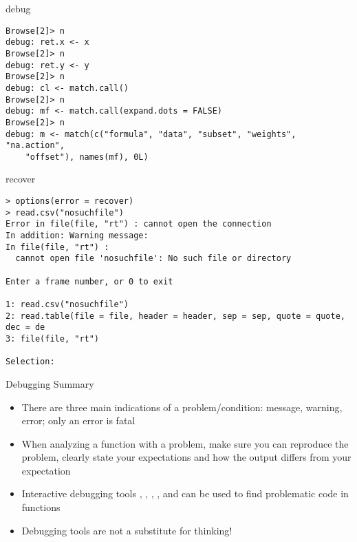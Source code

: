 \documentclass[aspectratio=169]{beamer}
\begin{document}
\begin{frame}[fragile]{debug}
\begin{verbatim}
Browse[2]> n
debug: ret.x <- x
Browse[2]> n
debug: ret.y <- y
Browse[2]> n
debug: cl <- match.call()
Browse[2]> n
debug: mf <- match.call(expand.dots = FALSE)
Browse[2]> n
debug: m <- match(c("formula", "data", "subset", "weights", "na.action", 
    "offset"), names(mf), 0L)
\end{verbatim}
\end{frame}

\begin{frame}[fragile]{recover}
\begin{verbatim}
> options(error = recover)
> read.csv("nosuchfile")
Error in file(file, "rt") : cannot open the connection
In addition: Warning message:
In file(file, "rt") :
  cannot open file 'nosuchfile': No such file or directory

Enter a frame number, or 0 to exit   

1: read.csv("nosuchfile")
2: read.table(file = file, header = header, sep = sep, quote = quote, dec = de
3: file(file, "rt")

Selection: 
\end{verbatim}
\end{frame}

\begin{frame}{Debugging}
Summary
\begin{itemize}
  \item There are three main indications of a problem/condition:
    message, warning, error; only an error is fatal
  \item When analyzing a function with a problem, make sure you can
    reproduce the problem, clearly state your expectations and how the
    output differs from your expectation
  \item Interactive debugging tools , ,
    , , and  can be used to
    find problematic code in functions
  \item Debugging tools are not a substitute for thinking!
\end{itemize}
\end{frame}
\end{document}

